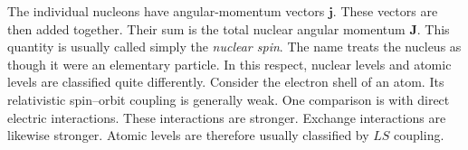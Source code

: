 The individual nucleons have angular-momentum vectors $\mathbf j$.
These vectors are then added together.
Their sum is the total nuclear angular momentum $\mathbf J$.
This quantity is usually called simply the \emph{nuclear spin}.
The name treats the nucleus as though it were an elementary particle.
In this respect, nuclear levels and atomic levels are classified quite differently.
Consider the electron shell of an atom.
Its relativistic spin--orbit coupling is generally weak.
One comparison is with direct electric interactions.
These interactions are stronger.
Exchange interactions are likewise stronger.
Atomic levels are therefore usually classified by $LS$ coupling.

